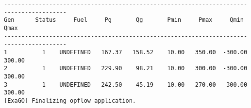 \begin{lstlisting}
----------------------------------------------------------------------------------------
Gen      Status     Fuel     Pg       Qg       Pmin     Pmax     Qmin     Qmax  
----------------------------------------------------------------------------------------
1          1    UNDEFINED   167.37   158.52    10.00   350.00  -300.00   300.00
2          1    UNDEFINED   229.90    98.21    10.00   300.00  -300.00   300.00
3          1    UNDEFINED   242.50    45.19    10.00   270.00  -300.00   300.00
[ExaGO] Finalizing opflow application.
\end{lstlisting}
